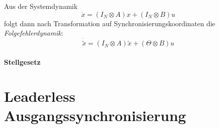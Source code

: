 Aus der Systemdynamik
\begin{equation}
    \dot{x} = (I_N \otimes A) x + (I_N \otimes B)u
\end{equation}
folgt dann nach Transformation auf Synchronisierungskoordinaten die
\emph{Folgefehlerdynamik}:
\begin{equation}
    \dot{\tilde{x}} = (I_N \otimes A) \tilde{x} + (\Theta \otimes B)u
\end{equation}

\paragraph{Stellgesetz}





\section{Leaderless Ausgangssynchronisierung}
